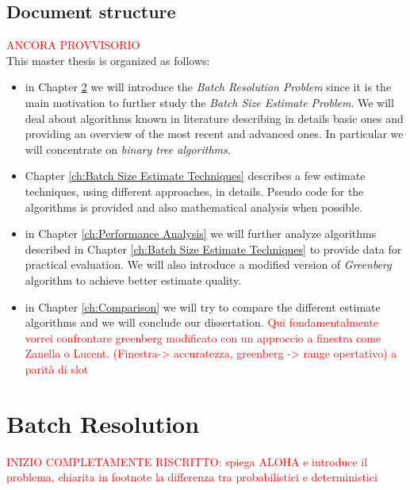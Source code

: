 \documentclass[11pt,a4paper,twoside,openright]{book}
\begin{document}
\section{Document structure}
\textcolor{red}{ANCORA PROVVISORIO}\\
This master thesis is organized as follows:
\begin{itemize}
\item in Chapter \ref{ch:Batch Resolution} we will introduce the \emph{Batch Resolution Problem} since it is the main motivation to further study the \emph{Batch Size Estimate Problem}. We will deal about algorithms known in literature describing in details basic ones and providing an overview of the most recent and advanced ones. In particular we will concentrate on \emph{binary tree algorithms}.
\item Chapter \ref{ch:Batch Size Estimate Techniques}  describes a few estimate techniques, using different approaches, in details.  Pseudo code for the algorithms is provided  and also mathematical analysis when possible. 

\item in Chapter \ref{ch:Performance Analysis} we will further analyze algorithms described in Chapter \ref{ch:Batch Size Estimate Techniques} to provide data for practical evaluation. We will also introduce a modified version of \emph{Greenberg} algorithm to achieve better estimate quality.
\item in Chapter \ref{ch:Comparison} we will try to compare the different estimate algorithms and we will conclude our dissertation. \textcolor{red}{Qui fondamentalmente vorrei confrontare greenberg modificato con un approccio a finestra come Zanella o Lucent. (Finestra-> accuratezza, greenberg -> range opertativo)  a parità di slot }\\
\end{itemize}

 

\chapter{Batch Resolution}
\label{ch:Batch Resolution}
\textcolor{red}{INIZIO COMPLETAMENTE RISCRITTO: spiega ALOHA e introduce il problema, chiarita in footnote la differenza tra probabilistici e deterministici}\\
\end{document}
